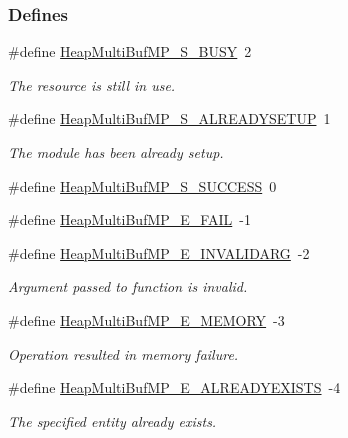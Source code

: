 \subsubsection*{Defines}
\begin{DoxyCompactItemize}
\item 
\#define \hyperlink{_heap_multi_buf_m_p_8h_a90c33c9402a75cbe4e26b02d8b399916}{HeapMultiBufMP\_\-S\_\-BUSY}~2
\begin{DoxyCompactList}\small\item\em The resource is still in use. \item\end{DoxyCompactList}\item 
\#define \hyperlink{_heap_multi_buf_m_p_8h_a8eb59b4affca50c201dc6e08ae1bb614}{HeapMultiBufMP\_\-S\_\-ALREADYSETUP}~1
\begin{DoxyCompactList}\small\item\em The module has been already setup. \item\end{DoxyCompactList}\item 
\#define \hyperlink{_heap_multi_buf_m_p_8h_ab1e8f168212f49a10090c1e0e88eb891}{HeapMultiBufMP\_\-S\_\-SUCCESS}~0
\item 
\#define \hyperlink{_heap_multi_buf_m_p_8h_aa539c8b8eaab1a246208b00d3cb95d89}{HeapMultiBufMP\_\-E\_\-FAIL}~-\/1
\item 
\#define \hyperlink{_heap_multi_buf_m_p_8h_a1f636d17043946e189a176d6e87b6892}{HeapMultiBufMP\_\-E\_\-INVALIDARG}~-\/2
\begin{DoxyCompactList}\small\item\em Argument passed to function is invalid. \item\end{DoxyCompactList}\item 
\#define \hyperlink{_heap_multi_buf_m_p_8h_a651ef3b2e6c5fccca7d6e81937007d4e}{HeapMultiBufMP\_\-E\_\-MEMORY}~-\/3
\begin{DoxyCompactList}\small\item\em Operation resulted in memory failure. \item\end{DoxyCompactList}\item 
\#define \hyperlink{_heap_multi_buf_m_p_8h_aa4a386a0533dcea1f4da27467fc57d1e}{HeapMultiBufMP\_\-E\_\-ALREADYEXISTS}~-\/4
\begin{DoxyCompactList}\small\item\em The specified entity already exists. \item\end{DoxyCompactList}\item 

\end{DoxyCompactItemize}
